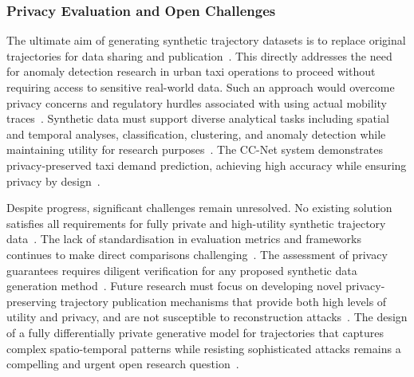 \subsubsection{Privacy Evaluation and Open Challenges}

The ultimate aim of generating synthetic trajectory datasets is to replace original trajectories for data sharing and publication~\cite{buchholzSystematisationKnowledgeTrajectory2024,raoLSTMTrajGANDeepLearning2020,liuTrajGANsUsingGenerative2018}. This directly addresses the need for anomaly detection research in urban taxi operations to proceed without requiring access to sensitive real-world data. Such an approach would overcome privacy concerns and regulatory hurdles associated with using actual mobility traces~\cite{buchholzSystematisationKnowledgeTrajectory2024,raoLSTMTrajGANDeepLearning2020,liuTrajGANsUsingGenerative2018}. Synthetic data must support diverse analytical tasks including spatial and temporal analyses, classification, clustering, and anomaly detection while maintaining utility for research purposes~\cite{raoLSTMTrajGANDeepLearning2020,chenDifferentiallyPrivateTrajectory2011}. The CC-Net system demonstrates privacy-preserved taxi demand prediction, achieving high accuracy while ensuring privacy by design~\cite{ozekiBalancingPrivacyUtility2023}.

Despite progress, significant challenges remain unresolved. No existing solution satisfies all requirements for fully private and high-utility synthetic trajectory data~\cite{buchholzSystematisationKnowledgeTrajectory2024}. The lack of standardisation in evaluation metrics and frameworks continues to make direct comparisons challenging~\cite{primaultLongRoadComputational2019,jinSurveyExperimentalStudy2023}. The assessment of privacy guarantees requires diligent verification for any proposed synthetic data generation method~\cite{buchholzSystematisationKnowledgeTrajectory2024}. Future research must focus on developing novel privacy-preserving trajectory publication mechanisms that provide both high levels of utility and privacy, and are not susceptible to reconstruction attacks~\cite{buchholzReconstructionAttackDifferential2022,buchholzSystematisationKnowledgeTrajectory2024,primaultLongRoadComputational2019}. The design of a fully differentially private generative model for trajectories that captures complex spatio-temporal patterns while resisting sophisticated attacks remains a compelling and urgent open research question~\cite{buchholzSystematisationKnowledgeTrajectory2024,buchholzReconstructionAttackDifferential2022}.

